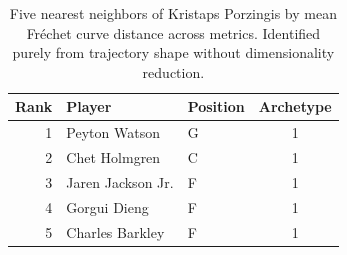 \begin{table}[htbp]
  \centering\small
  \begin{tabular}{rllc}
    \toprule
    Rank & Player & Position & Archetype \\
    \midrule
    1 & Peyton Watson & G & 1 \\
    2 & Chet Holmgren & C & 1 \\
    3 & Jaren Jackson Jr. & F & 1 \\
    4 & Gorgui Dieng & F & 1 \\
    5 & Charles Barkley & F & 1 \\
    \bottomrule
  \end{tabular}
  \caption{Five nearest neighbors of Kristaps Porzingis by mean Fr\'{e}chet curve distance across metrics. Identified purely from trajectory shape without dimensionality reduction.}
  \label{tab:Kristaps_Porzingis_frechet_curve_neighbors}
\end{table}


